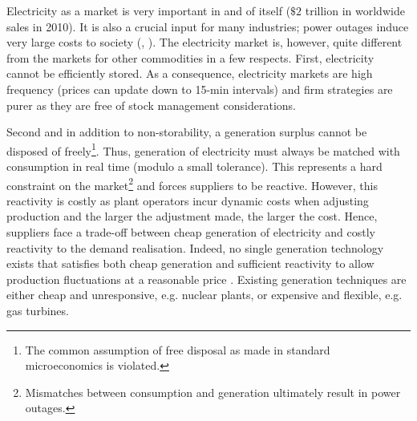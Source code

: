 Electricity as a market is very important in and of itself ($\$2$ trillion in worldwide sales in 2010). It is also a crucial input for many industries; power outages induce very large costs to society (\cite{lacommare2004understanding}, \cite{reichl2013power}). 
The electricity market is, however, quite different from the markets for other commodities in a few respects. First, electricity cannot be efficiently stored. As a consequence, electricity markets are high frequency (prices can update down to 15-min intervals) and firm strategies are purer as they are free of stock management considerations. 

Second and in addition to non-storability, a generation surplus cannot be disposed of freely\footnote{The common assumption of free disposal as made in standard microeconomics is violated.}. Thus, generation of electricity must always be matched with consumption in real time (modulo a small tolerance). This represents a hard constraint on the market\footnote{Mismatches between consumption and generation ultimately result in power outages.} and forces suppliers to be reactive. However, this reactivity is costly as plant operators incur dynamic costs when adjusting production and the larger the adjustment made, the larger the cost. 
Hence, suppliers face a trade-off between cheap generation of electricity and costly reactivity to the demand realisation. Indeed, no single generation technology exists that satisfies both cheap generation and sufficient reactivity to allow production fluctuations at a reasonable price . Existing generation techniques are either cheap and unresponsive, e.g. nuclear plants, or expensive and flexible, e.g. gas turbines. 
 
